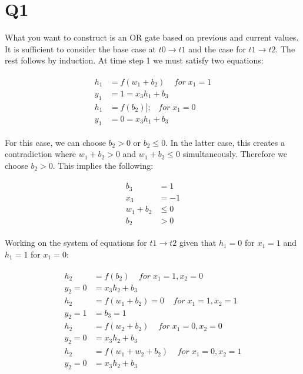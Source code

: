 \documentclass[11pt]{article}
\begin{document}
\section*{Q1}

What you want to construct is an OR gate based on previous and current values. It is sufficient to consider the base case at $t0 \rightarrow t1$ and the case for
$t1 \rightarrow t2$. The rest follows by induction. At time step 1 we must satisfy two equations:

\begin{align}
	\begin{split}
		h_1 &= f( w_1 + b_2 ) \;\;\;\; for \; x_1 = 1 \\
		y_1 &= 1 = x_3h_1+b_3 \\
		h_1 &= f(b_2) ];\;\;\; for \; x_1 = 0 \\
		y_1 &= 0 = x_3h_1+b_3
	\end{split}
\end{align}

\noindent For this case, we can choose $b_2 > 0$ or $b_2 \leq 0$. In the latter case, this creates a contradiction where $w_1 + b_2 > 0$ and $w_1 + b_2 \leq 0$
simultaneously. Therefore we choose $b_2 > 0$. This implies the following:

\begin{align}
	\begin{split}
		b_3 &= 1 \\
		x_3 &= -1 \\
		w_1+b_2 &\leq 0 \\
		b_2 &> 0	
	\end{split}
\end{align}

Working on the system of equations for $t1 \rightarrow t2$ given that $h_1=0$ for $x_1=1$ and $h_1=1$ for $x_1=0$:

\begin{align}
	\begin{split}
		h_2 &= f(b_2) \;\;\;\; for \; x_1 = 1, x_2 = 0 \\
		y_2 = 0 &= x_3h_2 + b_3 \\
		h_2 &= f(w_1+b_2) = 0 \;\;\;\; for \; x_1=1, x_2=1 \\
		y_2 = 1 &= b_3 = 1 \\
		h_2 &= f(w_2+b_2) \;\;\;\; for \; x_1=0, x_2=0 \\
		y_2 = 0 &= x_3h_2+b_3 \\
		h_2 &= f(w_1+w_2+b_2) \;\;\;\; for \; x_1=0, x_2=1 \\
		y_2 = 0 &= x_3h_2+b_3 
	\end{split}
\end{align}
\end{document}
